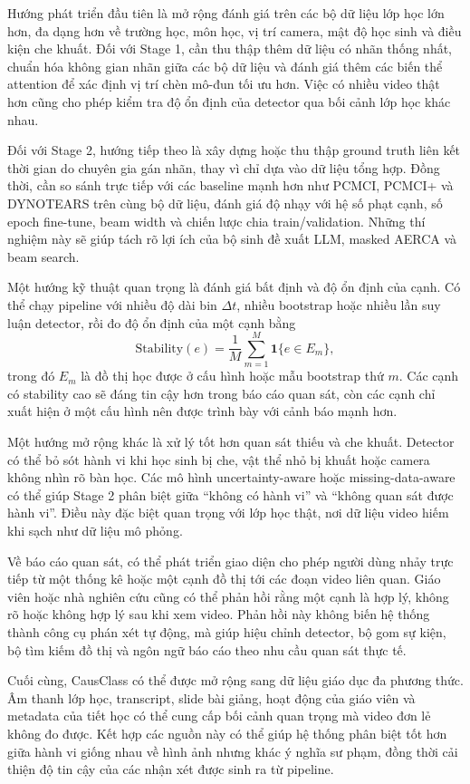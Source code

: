 Hướng phát triển đầu tiên là mở rộng đánh giá trên các bộ dữ liệu lớp học lớn hơn, đa dạng hơn về trường học, môn học, vị trí camera, mật độ học sinh và điều kiện che khuất. Đối với Stage 1, cần thu thập thêm dữ liệu có nhãn thống nhất, chuẩn hóa không gian nhãn giữa các bộ dữ liệu và đánh giá thêm các biến thể attention để xác định vị trí chèn mô-đun tối ưu hơn. Việc có nhiều video thật hơn cũng cho phép kiểm tra độ ổn định của detector qua bối cảnh lớp học khác nhau.

Đối với Stage 2, hướng tiếp theo là xây dựng hoặc thu thập ground truth liên kết thời gian do chuyên gia gán nhãn, thay vì chỉ dựa vào dữ liệu tổng hợp. Đồng thời, cần so sánh trực tiếp với các baseline mạnh hơn như PCMCI, PCMCI+ và DYNOTEARS trên cùng bộ dữ liệu, đánh giá độ nhạy với hệ số phạt cạnh, số epoch fine-tune, beam width và chiến lược chia train/validation. Những thí nghiệm này sẽ giúp tách rõ lợi ích của bộ sinh đề xuất LLM, masked AERCA và beam search.

Một hướng kỹ thuật quan trọng là đánh giá bất định và độ ổn định của cạnh. Có thể chạy pipeline với nhiều độ dài bin \(\Delta t\), nhiều bootstrap hoặc nhiều lần suy luận detector, rồi đo độ ổn định của một cạnh bằng
\begin{equation}
\label{eq:edge-stability}
    \mathrm{Stability}(e)=\frac{1}{M}\sum_{m=1}^{M}\mathbf{1}\{e\in E_m\},
\end{equation}
trong đó \(E_m\) là đồ thị học được ở cấu hình hoặc mẫu bootstrap thứ \(m\). Các cạnh có stability cao sẽ đáng tin cậy hơn trong báo cáo quan sát, còn các cạnh chỉ xuất hiện ở một cấu hình nên được trình bày với cảnh báo mạnh hơn.

Một hướng mở rộng khác là xử lý tốt hơn quan sát thiếu và che khuất. Detector có thể bỏ sót hành vi khi học sinh bị che, vật thể nhỏ bị khuất hoặc camera không nhìn rõ bàn học. Các mô hình uncertainty-aware hoặc missing-data-aware có thể giúp Stage 2 phân biệt giữa ``không có hành vi'' và ``không quan sát được hành vi''. Điều này đặc biệt quan trọng với lớp học thật, nơi dữ liệu video hiếm khi sạch như dữ liệu mô phỏng.

Về báo cáo quan sát, có thể phát triển giao diện cho phép người dùng nhảy trực tiếp từ một thống kê hoặc một cạnh đồ thị tới các đoạn video liên quan. Giáo viên hoặc nhà nghiên cứu cũng có thể phản hồi rằng một cạnh là hợp lý, không rõ hoặc không hợp lý sau khi xem video. Phản hồi này không biến hệ thống thành công cụ phán xét tự động, mà giúp hiệu chỉnh detector, bộ gom sự kiện, bộ tìm kiếm đồ thị và ngôn ngữ báo cáo theo nhu cầu quan sát thực tế.

Cuối cùng, CausClass có thể được mở rộng sang dữ liệu giáo dục đa phương thức. Âm thanh lớp học, transcript, slide bài giảng, hoạt động của giáo viên và metadata của tiết học có thể cung cấp bối cảnh quan trọng mà video đơn lẻ không đo được. Kết hợp các nguồn này có thể giúp hệ thống phân biệt tốt hơn giữa hành vi giống nhau về hình ảnh nhưng khác ý nghĩa sư phạm, đồng thời cải thiện độ tin cậy của các nhận xét được sinh ra từ pipeline.